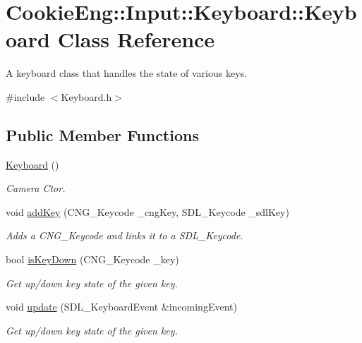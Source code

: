 \hypertarget{class_cookie_eng_1_1_input_1_1_keyboard_1_1_keyboard}{}\section{Cookie\+Eng\+:\+:Input\+:\+:Keyboard\+:\+:Keyboard Class Reference}
\label{class_cookie_eng_1_1_input_1_1_keyboard_1_1_keyboard}


A keyboard class that handles the state of various keys.  




{\ttfamily \#include $<$Keyboard.\+h$>$}

\subsection*{Public Member Functions}
\begin{DoxyCompactItemize}
\item 
\hyperlink{class_cookie_eng_1_1_input_1_1_keyboard_1_1_keyboard_a65d004a6431f3fba5e79c67d677a01cd}{Keyboard} ()
\begin{DoxyCompactList}\small\item\em Camera Ctor. \end{DoxyCompactList}\item 
void \hyperlink{class_cookie_eng_1_1_input_1_1_keyboard_1_1_keyboard_a27da39b7745ef5953465db0159ae876a}{add\+Key} (C\+N\+G\+\_\+\+Keycode \+\_\+cng\+Key, S\+D\+L\+\_\+\+Keycode \+\_\+sdl\+Key)
\begin{DoxyCompactList}\small\item\em Adds a C\+N\+G\+\_\+\+Keycode and links it to a S\+D\+L\+\_\+\+Keycode. \end{DoxyCompactList}\item 
bool \hyperlink{class_cookie_eng_1_1_input_1_1_keyboard_1_1_keyboard_aa5a05911bc70b35341e2d6ff7db7ce6c}{is\+Key\+Down} (C\+N\+G\+\_\+\+Keycode \+\_\+key)
\begin{DoxyCompactList}\small\item\em Get up/down key state of the given key. \end{DoxyCompactList}\item 
void \hyperlink{class_cookie_eng_1_1_input_1_1_keyboard_1_1_keyboard_a2e38885012c428de44e6bca881bb305d}{update} (S\+D\+L\+\_\+\+Keyboard\+Event \&incoming\+Event)
\begin{DoxyCompactList}\small\item\em Get up/down key state of the given key. \end{DoxyCompactList}\end{DoxyCompactItemize}
